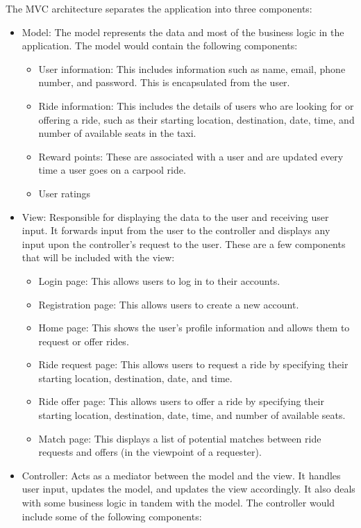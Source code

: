 \documentclass[]{article}
\begin{document}
The MVC architecture separates the application into three components:
\begin{itemize}
    \item Model: The model represents the data and most of the business logic in the application. The model would contain the following components:
    \begin{itemize}
        \item User information: This includes information such as name, email, phone number, and password. This is encapsulated from the user.
        \item Ride information: This includes the details of users who are looking for or offering a ride, such as their starting location, destination, date, time, and number of available seats in the taxi.
        \item Reward points: These are associated with a user and are updated every time a user goes on a carpool ride.
        \item User ratings
    \end{itemize}
    \item View: Responsible for displaying the data to the user and receiving user input. It forwards input from the user to the controller and displays any input upon the controller's request to the user. These are a few components that will be included with the view:
    \begin{itemize}
        \item Login page: This allows users to log in to their accounts.
        \item Registration page: This allows users to create a new account.
        \item Home page: This shows the user's profile information and allows them to request or offer rides.
        \item Ride request page: This allows users to request a ride by specifying their starting location, destination, date, and time.
        \item Ride offer page: This allows users to offer a ride by specifying their starting location, destination, date, time, and number of available seats.
        \item Match page: This displays a list of potential matches between ride requests and offers (in the viewpoint of a requester).
    \end{itemize}
    \item Controller: Acts as a mediator between the model and the view. It handles user input, updates the model, and updates the view accordingly. It also deals with some business logic in tandem with the model. The controller would include some of the following components:

\end{itemize}
\end{document}

